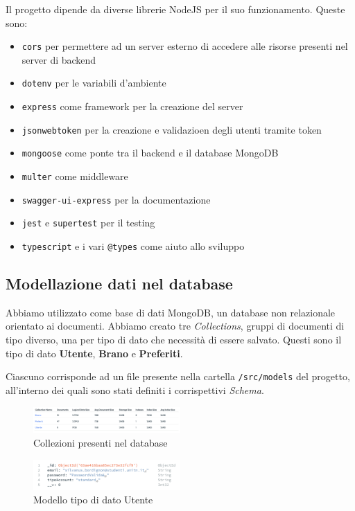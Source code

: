 \documentclass[a4paper,12pt]{article}
\begin{document}
Il progetto dipende da diverse librerie NodeJS per il suo funzionamento. Queste sono:
\begin{itemize}
    \item \texttt{cors} per permettere ad un server esterno di accedere alle risorse presenti nel server di backend
    \item \texttt{dotenv} per le variabili d'ambiente
    \item \texttt{express} come framework per la creazione del server
    \item \texttt{jsonwebtoken} per la creazione e validazioen degli utenti tramite token
    \item \texttt{mongoose} come ponte tra il backend e il database MongoDB
    \item \texttt{multer} come middleware
    \item \texttt{swagger-ui-express} per la documentazione
    \item \texttt{jest} e \texttt{supertest} per il testing
    \item \texttt{typescript} e i vari \texttt{@types} come aiuto allo sviluppo
\end{itemize}

\subsection{Modellazione dati nel database}

Abbiamo utilizzato come base di dati MongoDB, un database non relazionale orientato ai documenti. Abbiamo creato tre \textit{Collections}, gruppi di documenti di tipo diverso, una per tipo di dato che necessità di essere salvato. Questi sono il tipo di dato \textbf{Utente}, \textbf{Brano} e \textbf{Preferiti}.

Ciascuno corrisponde ad un file presente nella cartella \texttt{/src/models} del progetto, all'interno dei quali sono stati definiti i corrispettivi \textit{Schema}.

\begin{figure}[htp]
    \centering
    \includegraphics[width=0.5\textwidth]{code/collezione-dati.png}
    \caption{Collezioni presenti nel database}
\end{figure}

\begin{figure}[htp]
    \centering
    \includegraphics[width=0.5\textwidth]{code/modello-utente.png}
    \caption{Modello tipo di dato Utente}
\end{figure}
\end{document}
